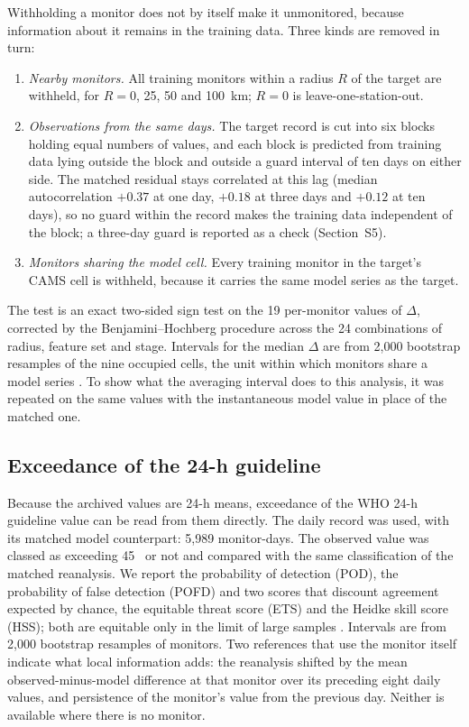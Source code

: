 Withholding a monitor does not by itself make it unmonitored, because information about it
remains in the training data. Three kinds are removed in turn:
\begin{enumerate}
\item \emph{Nearby monitors.} All training monitors within a radius $R$ of the target are
      withheld, for $R=0$, 25, 50 and 100~km; $R=0$ is leave-one-station-out.
\item \emph{Observations from the same days.} The target record is cut into six blocks holding
      equal numbers of values, and each block is predicted from training data lying outside the
      block and outside a guard interval of ten days on either side. The matched residual stays
      correlated at this lag (median autocorrelation $+0.37$ at one day, $+0.18$ at three days
      and $+0.12$ at ten days), so no guard within the record makes the training data independent
      of the block; a three-day guard is reported as a check (Section~S5).
\item \emph{Monitors sharing the model cell.} Every training monitor in the target's CAMS cell
      is withheld, because it carries the same model series as the target.
\end{enumerate}
The test is an exact two-sided sign test on the 19 per-monitor values of $\Delta$, corrected by
the Benjamini--Hochberg procedure \citep{benjamini1995} across the 24 combinations of radius,
feature set and stage. Intervals for the median $\Delta$ are from 2,000 bootstrap resamples of
the nine occupied cells, the unit within which monitors share a model series \citep{efron1979}.
To show what the averaging interval does to this analysis, it was repeated on the same values
with the instantaneous model value in place of the matched one.

\subsection{Exceedance of the 24-h guideline}

Because the archived values are 24-h means, exceedance of the WHO 24-h guideline value can be
read from them directly. The daily record was used, with its matched model counterpart: 5,989
monitor-days. The observed value was classed as exceeding 45~\ugm{} or not and compared with the
same classification of the matched reanalysis. We report the probability of detection (POD), the
probability of false detection (POFD) and two scores that discount agreement expected by chance,
the equitable threat score (ETS) and the Heidke skill score (HSS); both are equitable only in
the limit of large samples \citep{hogan2010}. Intervals are from 2,000
bootstrap resamples of monitors. Two references that use the monitor itself indicate what local
information adds: the reanalysis shifted by the mean observed-minus-model difference at that
monitor over its preceding eight daily values, and persistence of the monitor's value from the
previous day. Neither is available where there is no monitor.

